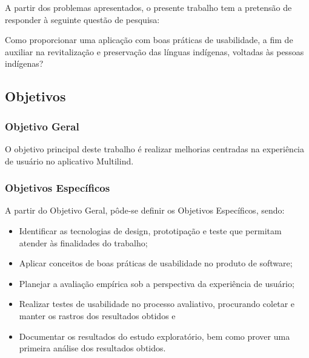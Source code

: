 A partir dos problemas apresentados, o presente trabalho tem a pretensão de responder à seguinte questão de pesquisa:

Como proporcionar uma aplicação com boas práticas de usabilidade, a fim de auxiliar na revitalização e preservação das línguas indígenas, voltadas às pessoas indígenas?

\subsection{Objetivos}
\label{sec:Objetivos}

\subsubsection{Objetivo Geral}

O objetivo principal deste trabalho é realizar melhorias centradas na experiência de usuário no aplicativo Multilind.

\subsubsection{Objetivos Específicos}

\begin{description}
    \item A partir do Objetivo Geral, pôde-se definir os Objetivos Específicos, sendo:
          \begin{itemize}
              \item Identificar as tecnologias de design, prototipação e teste que permitam atender às finalidades do trabalho;

              \item Aplicar conceitos de boas práticas de usabilidade no produto de software;

              \item Planejar a avaliação empírica sob a perspectiva da experiência de usuário;

              \item Realizar testes de usabilidade no processo avaliativo, procurando coletar e manter os rastros dos resultados obtidos e

              \item Documentar os resultados do estudo exploratório, bem como prover uma primeira análise dos resultados obtidos.
          \end{itemize}
\end{description}

